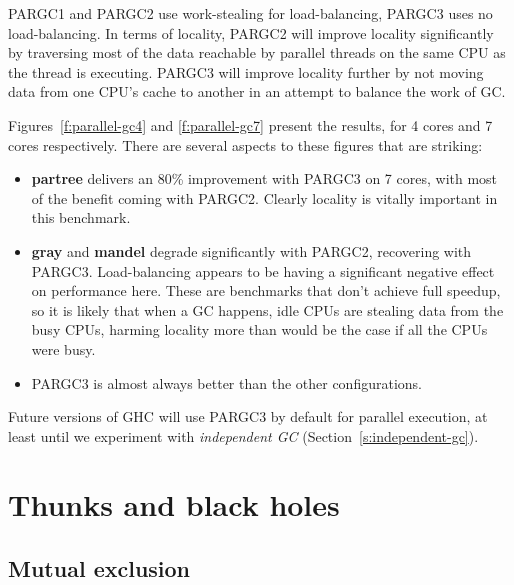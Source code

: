 \documentclass[twocolumn,9pt]{sigplanconf}
\begin{document}
PARGC1 and PARGC2 use work-stealing for load-balancing, PARGC3 uses no
load-balancing.  In terms of locality, PARGC2 will improve locality
significantly by traversing most of the data reachable by parallel
threads on the same CPU as the thread is executing.  PARGC3 will
improve locality further by not moving data from one CPU's cache to
another in an attempt to balance the work of GC.

Figures~\ref{f:parallel-gc4} and \ref{f:parallel-gc7} present the
results, for 4 cores and 7 cores respectively. There are several
aspects to these figures that are striking:

\begin{itemize}
\item \textbf{partree} delivers an 80\% improvement with PARGC3 on 7
  cores, with most of the benefit coming with PARGC2.  Clearly
  locality is vitally important in this benchmark.
\item \textbf{gray} and \textbf{mandel} degrade significantly with
  PARGC2, recovering with PARGC3.  Load-balancing appears to be having
  a significant negative effect on performance here.  These are
  benchmarks that don't achieve full speedup, so it is likely that
  when a GC happens, idle CPUs are stealing data from the busy CPUs,
  harming locality more than would be the case if all the CPUs were
  busy.
\item PARGC3 is almost always better than the other configurations.
\end{itemize}

Future versions of GHC will use PARGC3 by default for parallel
execution, at least until we experiment with \emph{independent GC}
(Section~\ref{s:independent-gc}).

\section{Thunks and black holes}
\label{s:black-hole}

\subsection{Mutual exclusion}
\label{s:eager-blackholing}
\end{document}
